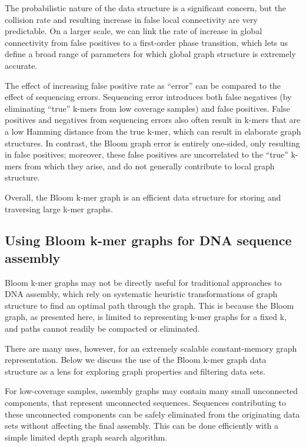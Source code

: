\documentclass[12pt]{article} \usepackage{simplemargins}
\begin{document}
The probabilistic nature of the data structure is a significant
concern, but the collision rate and resulting increase in false local
connectivity are very predictable.  On a larger scale, we can link the
rate of increase in global connectivity from false positives to a
first-order phase transition, which lets us define a broad range of
parameters for which global graph structure is extremely accurate.

The effect of increasing false positive rate as ``error'' can be
compared to the effect of sequencing errors.  Sequencing error
introduces both false negatives (by eliminating ``true'' k-mers from
low coverage samples) and false positives.  False positives and
negatives from sequencing errors also often result in k-mers that are
a low Hamming distance from the true k-mer, which can result in
elaborate graph structures.  In contrast, the Bloom graph error is
entirely one-sided, only resulting in false positives; moreover, these
false positives are uncorrelated to the ``true'' k-mers from which
they arise, and do not generally contribute to local graph structure.

Overall, the Bloom k-mer graph is an efficient data structure for
storing and traversing large k-mer graphs.

\subsection{Using Bloom k-mer graphs for DNA sequence assembly}

Bloom k-mer graphs may not be directly useful for traditional
approaches to DNA assembly, which rely on systematic heuristic
transformations of graph structure to find an optimal path through the
graph.  This is because the Bloom graph, as presented here, is limited
to representing k-mer graphs for a fixed k, and paths cannot readily
be compacted or eliminated.

There are many uses, however, for an extremely scalable
constant-memory graph representation.  Below we discuss the use of the
Bloom k-mer graph data structure as a lens for exploring graph
properties and filtering data sets.

For low-coverage samples, assembly graphs may contain many small
unconnected components, that represent unconnected sequences.
Sequences contributing to these unconnected components can be safely
eliminated from the originating data sets without affecting the final
assembly.  This can be done efficiently with a simple limited depth
graph search algorithm.
\end{document}

